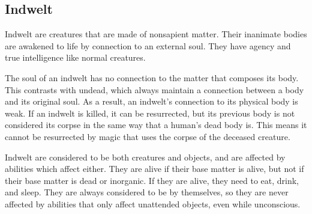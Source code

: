    \subsection{Indwelt}\label{Indwelt}
        Indwelt are creatures that are made of nonsapient matter.
        Their inanimate bodies are awakened to life by connection to an external soul.
        They have agency and true intelligence like normal creatures.

        The soul of an indwelt has no connection to the matter that composes its body.
        This contrasts with undead, which always maintain a connection between a body and its original soul.
        As a result, an indwelt's connection to its physical body is weak.
        If an indwelt is killed, it can be resurrected, but its previous body is not considered its corpse in the same way that a human's dead body is.
        This means it cannot be resurrected by magic that uses the corpse of the deceased creature.

        Indwelt are considered to be both creatures and objects, and are affected by abilities which affect either.
        They are alive if their base matter is alive, but not if their base matter is dead or inorganic.
        If they are alive, they need to eat, drink, and sleep.
        They are always considered to be  by themselves, so they are never affected by abilities that only affect unattended objects, even while unconscious.

